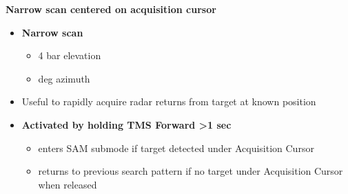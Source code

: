 \begin{tcoloritemize}
    \textbf{Narrow scan centered on acquisition cursor}
    \begin{itemize}
        \item \textbf{Narrow scan}
        \begin{itemize}
            \item 4 bar elevation 
            \item {} deg azimuth
        \end{itemize}
        \item Useful to rapidly acquire radar returns from target at known position
        \item \textbf{Activated by holding TMS Forward >1 sec}
        \begin{itemize}
            \item enters SAM submode if target detected under Acquisition Cursor
            \item returns to previous search pattern if no target under Acquisition Cursor when released
        \end{itemize}
    \end{itemize}
\end{tcoloritemize}

